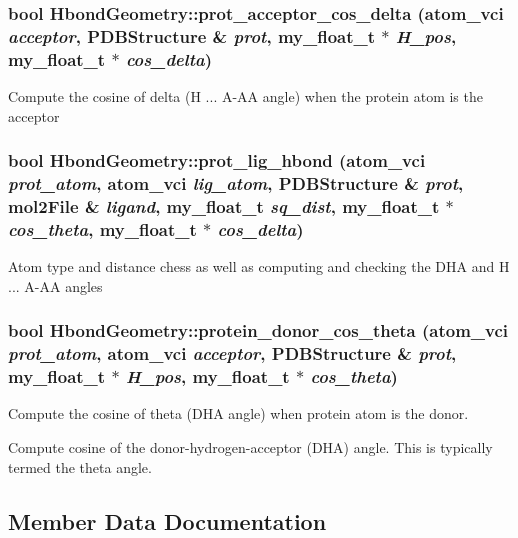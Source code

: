 \subsubsection{\setlength{\rightskip}{0pt plus 5cm}bool Hbond\-Geometry::prot\_\-acceptor\_\-cos\_\-delta (atom\_\-vci {\em acceptor}, \bf{PDBStructure} \& {\em prot}, my\_\-float\_\-t $\ast$ {\em H\_\-pos}, my\_\-float\_\-t $\ast$ {\em cos\_\-delta})}\label{classASCbase_1_1HbondGeometry_f618291bc802e111027a06eb98ca1946}


Compute the cosine of delta (H ... A-AA angle) when the protein atom is the acceptor 
\subsubsection{\setlength{\rightskip}{0pt plus 5cm}bool Hbond\-Geometry::prot\_\-lig\_\-hbond (atom\_\-vci {\em prot\_\-atom}, atom\_\-vci {\em lig\_\-atom}, \bf{PDBStructure} \& {\em prot}, \bf{mol2File} \& {\em ligand}, my\_\-float\_\-t {\em sq\_\-dist}, my\_\-float\_\-t $\ast$ {\em cos\_\-theta}, my\_\-float\_\-t $\ast$ {\em cos\_\-delta})}\label{classASCbase_1_1HbondGeometry_f285f2ddcc67f20d410fdccf1d053ed4}


Atom type and distance chess as well as computing and checking the DHA and H ... A-AA angles 
\subsubsection{\setlength{\rightskip}{0pt plus 5cm}bool Hbond\-Geometry::protein\_\-donor\_\-cos\_\-theta (atom\_\-vci {\em prot\_\-atom}, atom\_\-vci {\em acceptor}, \bf{PDBStructure} \& {\em prot}, my\_\-float\_\-t $\ast$ {\em H\_\-pos}, my\_\-float\_\-t $\ast$ {\em cos\_\-theta})}\label{classASCbase_1_1HbondGeometry_af52b4614187640cdad06cbddab9655f}


Compute the cosine of theta (DHA angle) when protein atom is the donor. 

Compute cosine of the donor-hydrogen-acceptor (DHA) angle. This is typically termed the theta angle. 

\subsection{Member Data Documentation}
